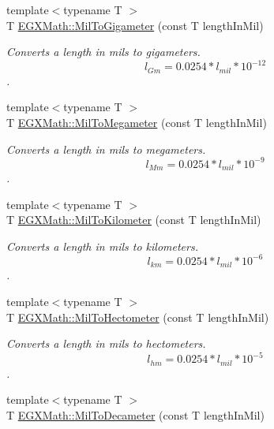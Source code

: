 \begin{DoxyCompactItemize}
{\footnotesize template$<$typename T $>$ }\\T \mbox{\hyperlink{group___e_g_x_math-_conversions-_length_conversions-_imperial-_mil-_s_i_ga283913ddb1b82447c2ff61ec5287a35f}{E\+G\+X\+Math\+::\+Mil\+To\+Gigameter}} (const T length\+In\+Mil)
\begin{DoxyCompactList}\small\item\em Converts a length in mils to gigameters. \[ l_{Gm}=0.0254* l_{mil} * 10^{-12} \]. \end{DoxyCompactList}\item 
{\footnotesize template$<$typename T $>$ }\\T \mbox{\hyperlink{group___e_g_x_math-_conversions-_length_conversions-_imperial-_mil-_s_i_gae228b3057d3b2341ab55f72895588b5e}{E\+G\+X\+Math\+::\+Mil\+To\+Megameter}} (const T length\+In\+Mil)
\begin{DoxyCompactList}\small\item\em Converts a length in mils to megameters. \[ l_{Mm}=0.0254* l_{mil} * 10^{-9} \]. \end{DoxyCompactList}\item 
{\footnotesize template$<$typename T $>$ }\\T \mbox{\hyperlink{group___e_g_x_math-_conversions-_length_conversions-_imperial-_mil-_s_i_gac5c7770c3ef34ea18bb8ff86c7093621}{E\+G\+X\+Math\+::\+Mil\+To\+Kilometer}} (const T length\+In\+Mil)
\begin{DoxyCompactList}\small\item\em Converts a length in mils to kilometers. \[ l_{km}=0.0254 * l_{mil} * 10^{-6}\]. \end{DoxyCompactList}\item 
{\footnotesize template$<$typename T $>$ }\\T \mbox{\hyperlink{group___e_g_x_math-_conversions-_length_conversions-_imperial-_mil-_s_i_ga433a3360f7bf01c5c347b9d3ba3074a5}{E\+G\+X\+Math\+::\+Mil\+To\+Hectometer}} (const T length\+In\+Mil)
\begin{DoxyCompactList}\small\item\em Converts a length in mils to hectometers. \[ l_{hm}=0.0254* l_{mil} * 10^{-5} \]. \end{DoxyCompactList}\item 
{\footnotesize template$<$typename T $>$ }\\T \mbox{\hyperlink{group___e_g_x_math-_conversions-_length_conversions-_imperial-_mil-_s_i_ga04eab639339270142a55aa2655fc0db8}{E\+G\+X\+Math\+::\+Mil\+To\+Decameter}} (const T length\+In\+Mil)

\end{DoxyCompactItemize}
